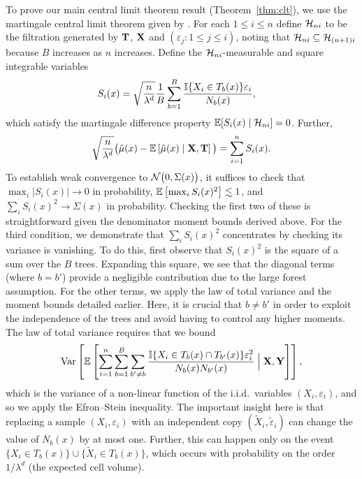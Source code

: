 To prove our main central limit theorem result (Theorem~\ref{thm:clt}), we use
the martingale central limit theorem given by
\citet[Theorem~3.2]{hall2014martingale}. For each $1 \leq i \leq n$ define
$\mathcal{H}_{n i}$ to be the filtration generated by $\mathbf{T}$, $\mathbf{X}$ and
$(\varepsilon_j : 1 \leq j \leq i)$, noting that
$\mathcal{H}_{n i} \subseteq \mathcal{H}_{(n+1)i}$ because $B$ increases as $n$ increases.
Define the $\mathcal{H}_{n i}$-measurable and square integrable variables
%
\begin{align*}
  S_i(x) &=
  \sqrt{\frac{n}{\lambda^d}} \frac{1}{B} \sum_{b=1}^B
  \frac{\mathbb{I} \{X_i \in T_b(x)\} \varepsilon_i} {N_{b}(x)},
\end{align*}
%
which satisfy the martingale difference property
$\mathbb{E} [ S_i(x) \mid \mathcal{H}_{n i} ] = 0$. Further,
%
\begin{align*}
  \sqrt{\frac{n}{\lambda^d}}
  \big(
    \hat\mu(x)
    - \mathbb{E}\left[
      \hat\mu(x) \mid \mathbf{X}, \mathbf{T}
    \right]
  \big)
  = \sum_{i=1}^n S_i(x).
\end{align*}
%
To establish weak convergence to $\mathcal{N}\big(0, \Sigma(x)\big)$,
it suffices to check that $\max_i |S_i(x)| \to 0$ in probability,
$\mathbb{E}\left[\max_i S_i(x)^2\right] \lesssim 1$,
and $\sum_i S_i(x)^2 \to \Sigma(x)$ in probability.
Checking the first two of these is straightforward given the denominator moment
bounds derived above. For the third condition, we demonstrate that
$\sum_i S_i(x)^2$ concentrates by checking its variance is vanishing. To do
this, first observe that $S_i(x)^2$ is the square of a sum over the $B$ trees.
Expanding this square, we see that the diagonal terms (where $b = b'$) provide
a negligible contribution due to the large forest assumption. For the other
terms, we apply the law of total variance and the moment bounds detailed
earlier. Here, it is crucial that $b \neq b'$ in order to exploit the
independence of the trees and avoid having to control any higher moments. The
law of total variance requires that we bound
%
\begin{align*}
  \operatorname{Var} \left[
    \mathbb{E} \left[
      \sum_{i=1}^n \sum_{b=1}^B \sum_{b' \neq b}
      \frac{\mathbb{I}\{X_i \in T_b(x) \cap T_{b'}(x)\} \varepsilon_i^2}
      {N_{b}(x) N_{b'}(x)} \Bigm| \mathbf{X}, \mathbf{Y}
    \right]
  \right],
\end{align*}
%
which is the variance of a non-linear function of the i.i.d.\ variables
$(X_i, \varepsilon_i)$, and so we apply the Efron--Stein inequality.
The important insight here is that replacing a sample
$(X_i, \varepsilon_i)$ with an independent copy
$(\tilde X_i, \tilde \varepsilon_i)$ can change the value of
$N_b(x)$ by at most one. Further, this can happen only on the event
$\{ X_i \in T_{b}(x) \} \cup \{ \tilde X_i \in T_{b}(x) \}$,
which occurs with probability on the order $1/\lambda^d$
(the expected cell volume).

